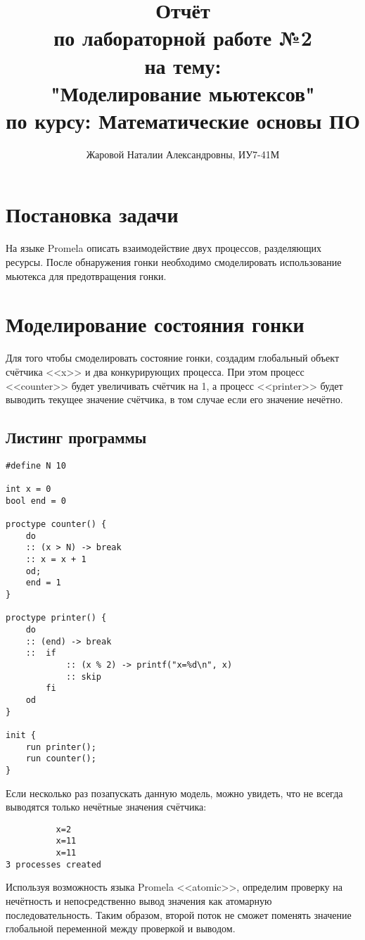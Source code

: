 \documentclass[a4paper,12pt]{report}
\title{Отчёт \\ по лабораторной работе №2 \\ на тему: \\ "Моделирование мьютексов" \\ по курсу: Математические основы ПО}
\author{Жаровой Наталии Александровны, ИУ7-41М\\}
\begin{document}
\maketitle

\section*{Постановка задачи}

На языке Promela описать взаимодействие двух процессов, разделяющих ресурсы. После обнаружения гонки необходимо 
смоделировать использование мьютекса для предотвращения гонки.

\section*{Моделирование состояния гонки}
Для того чтобы смоделировать состояние гонки, создадим глобальный объект счётчика <<x>> и два
конкурирующих процесса. При этом процесс <<counter>> будет увеличивать счётчик на 1, а процесс <<printer>>
будет выводить текущее значение счётчика, в том случае если его значение нечётно.

\subsection*{Листинг программы}
\begin{Verbatim}
#define N 10

int x = 0
bool end = 0

proctype counter() {
    do
    :: (x > N) -> break
    :: x = x + 1
    od;
    end = 1
}

proctype printer() {
    do
    :: (end) -> break
    ::  if
            :: (x % 2) -> printf("x=%d\n", x)
            :: skip
        fi
    od
}

init {
    run printer();
    run counter();
}
\end{Verbatim}

Если несколько раз позапускать данную модель, можно увидеть, что не всегда выводятся только нечётные значения счётчика:
\begin{Verbatim}
          x=2
          x=11
          x=11
3 processes created
\end{Verbatim}

Используя возможность языка Promela <<atomic>>, определим проверку на нечётность и непосредственно вывод значения как атомарную последовательность.
Таким образом, второй поток не сможет поменять значение глобальной переменной между проверкой и выводом.
\end{document}
